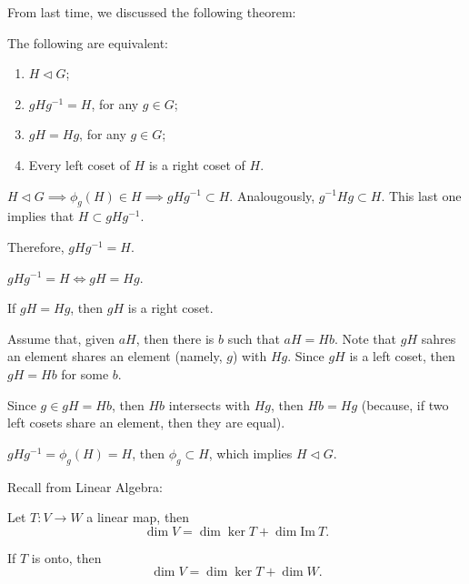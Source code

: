 
From last time, we discussed the following theorem:

\begin{thm} The following are equivalent:
	\begin{enumerate}
		\item $H \vartriangleleft G$;
		\item $gHg^{-1} = H$, for any $g \in G$;
		\item $gH = Hg$, for any  $g \in G$;
		\item Every left coset of $H$ is a right coset of $H$.
	\end{enumerate}
\end{thm}

\begin{dem}[$i$ $\implies$ $ii$]
	$H \vartriangleleft G \implies \phi_g(H) \in H \implies gHg^{-1} \subset H$.
	Analougously, $g^{-1}Hg \subset H$. This last one implies that $H \subset gHg^{-1}$.

	Therefore,  $gHg^{-1} = H$.
\end{dem}

\begin{dem}
	$gHg^{-1} = H \iff gH = Hg$.
\end{dem}

\begin{dem}
	If $gH = Hg$, then  $gH$ is a right coset.
\end{dem}

\begin{dem}
	Assume that, given $aH$, then there is $b$ such that $aH = Hb$. Note that $gH$ sahres an element shares an element (namely, $g$) with $Hg$.
	Since $gH$ is a left coset, then  $gH = Hb$ for some $b$.

	Since $g \in gH = Hb$, then $Hb$ intersects with $Hg$, then $Hb = Hg$ (because, if two left cosets share an element, then they are equal).
\end{dem}

\begin{dem}[$ii \implies i$]
	$gHg^{-1} = \phi_g(H) = H$, then $\phi_g \subset H$, which implies $H \vartriangleleft G$.
\end{dem}

Recall from Linear Algebra:

\begin{thm}
	Let $T: V \to W$ a linear map, then
	\[\dim V = \dim \ker T + \dim \mathrm{Im}\ T.\]

	If $T$ is onto, then	
	\[\dim V = \dim \ker T + \dim W.\]
\end{thm}

